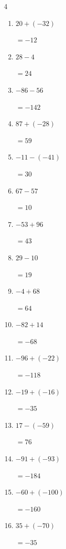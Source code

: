 \begin{multicols}{4}
\begin{enumerate}
        $=-62$

  \item $20+(-32)$

        $=-12$

  \item $28-4$

        $=24$

\columnbreak %

\resetques

  \item $-86-56$

        $=-142$

  \item $87+(-28)$

        $=59$

  \item $-11-(-41)$

        $=30$

  \item $67-57$

        $=10$

  \item $-53+96$

        $=43$

  \item $29-10$

        $=19$

  \item $-4+68$

        $=64$

  \item $-82+14$

        $=-68$

  \item $-96+(-22)$

        $=-118$

  \item $-19+(-16)$

        $=-35$

  \item $17-(-59)$

        $=76$

  \item $-91+(-93)$

        $=-184$

  \item $-60+(-100)$

        $=-160$

  \item $35+(-70)$

        $=-35$


\end{enumerate}
\end{multicols}
